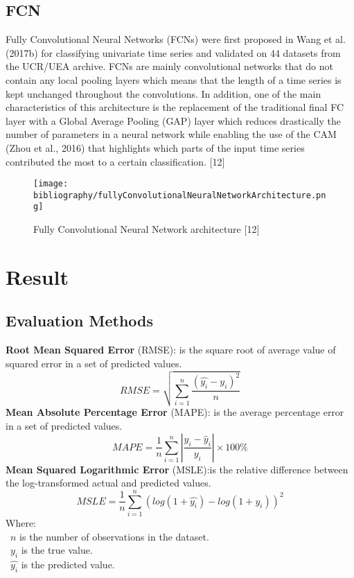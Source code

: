 \documentclass{ieeeojies}
\begin{document}
\subsection{FCN}
Fully Convolutional Neural Networks (FCNs) were first proposed in Wang et al. (2017b) for classifying univariate time series and validated on 44 datasets from the UCR/UEA archive. FCNs are mainly convolutional networks that do not contain any local pooling layers which means that the length of a time series is kept unchanged throughout the convolutions. In addition, one of the main characteristics of this architecture is the replacement of the traditional final FC layer with a Global Average Pooling (GAP) layer which reduces drastically the number of parameters in a neural network while enabling the use of the CAM (Zhou et al., 2016) that highlights which parts of the input time series contributed the most to a certain classification.  [12]
\begin{figure}[H]
    \centering
    \begin{minipage}{1\linewidth}
        \centering
        \texttt{[image: bibliography/fullyConvolutionalNeuralNetworkArchitecture.png]}
        \caption{Fully Convolutional Neural Network architecture [12]}
        \label{fig11}
    \end{minipage}
\end{figure}

\section{Result}
\subsection{Evaluation Methods}
\textbf{Root Mean Squared Error} (RMSE): is the square root of average value of squared error in a set of predicted values.
\[RMSE=\sqrt{\sum_{i=1}^{n} \frac{(\hat{y_i}-y_i )^2}{n} }\]
\textbf{Mean Absolute Percentage Error} (MAPE): is the average percentage error in a set of predicted values.
\[MAPE = \frac{1}{n} \sum_{i=1}^{n} \left| \frac{y_i - \hat{y}_i}{y_i} \right| \times 100\%\]
\textbf{Mean Squared Logarithmic Error} (MSLE):is the relative difference between the log-transformed actual and predicted values.\\
\[MSLE=\frac{1}{n}\sum_{i=1}^{n}(log(1+\hat{y_i})-log(1+y_i))^2\]
Where: \\
	\indent\textbullet\ \(n\) is the number of observations in the dataset.\\
	\indent\textbullet\ \(y_i\)  is the true value.\\
	\indent\textbullet\ \(\hat{y_i}\) is the predicted value.
\end{document}
